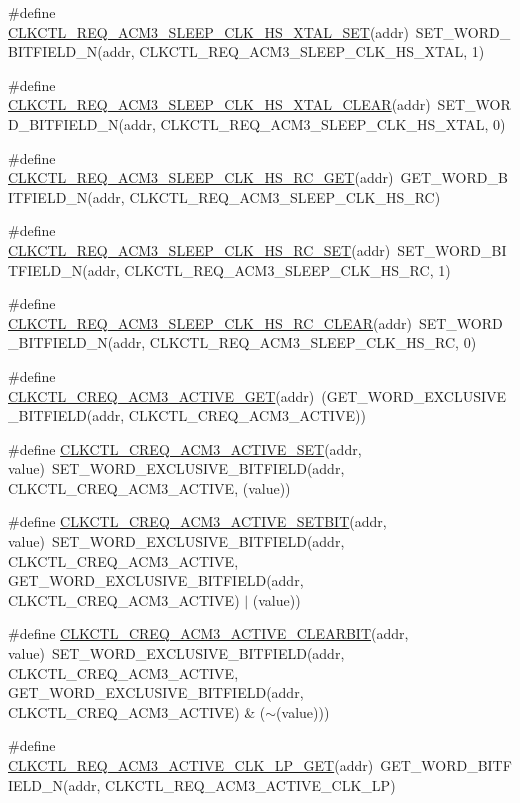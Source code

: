 \begin{DoxyCompactItemize}
\item 
\#define \hyperlink{a00544_a3b97603ae420a4f4932cf851264723a7}{CLKCTL\_\-REQ\_\-ACM3\_\-SLEEP\_\-CLK\_\-HS\_\-XTAL\_\-SET}(addr)~SET\_\-WORD\_\-BITFIELD\_\-N(addr, CLKCTL\_\-REQ\_\-ACM3\_\-SLEEP\_\-CLK\_\-HS\_\-XTAL, 1)
\item 
\#define \hyperlink{a00544_ad00a3b3bf580e5093fbccb3955e1a0e8}{CLKCTL\_\-REQ\_\-ACM3\_\-SLEEP\_\-CLK\_\-HS\_\-XTAL\_\-CLEAR}(addr)~SET\_\-WORD\_\-BITFIELD\_\-N(addr, CLKCTL\_\-REQ\_\-ACM3\_\-SLEEP\_\-CLK\_\-HS\_\-XTAL, 0)
\item 
\#define \hyperlink{a00544_a6a5a31e0deb77cef2989db5e781b746c}{CLKCTL\_\-REQ\_\-ACM3\_\-SLEEP\_\-CLK\_\-HS\_\-RC\_\-GET}(addr)~GET\_\-WORD\_\-BITFIELD\_\-N(addr, CLKCTL\_\-REQ\_\-ACM3\_\-SLEEP\_\-CLK\_\-HS\_\-RC)
\item 
\#define \hyperlink{a00544_a28e37b394303ddebf51e146990edf95c}{CLKCTL\_\-REQ\_\-ACM3\_\-SLEEP\_\-CLK\_\-HS\_\-RC\_\-SET}(addr)~SET\_\-WORD\_\-BITFIELD\_\-N(addr, CLKCTL\_\-REQ\_\-ACM3\_\-SLEEP\_\-CLK\_\-HS\_\-RC, 1)
\item 
\#define \hyperlink{a00544_a158cfcd72570c20b5088de8d681a7d19}{CLKCTL\_\-REQ\_\-ACM3\_\-SLEEP\_\-CLK\_\-HS\_\-RC\_\-CLEAR}(addr)~SET\_\-WORD\_\-BITFIELD\_\-N(addr, CLKCTL\_\-REQ\_\-ACM3\_\-SLEEP\_\-CLK\_\-HS\_\-RC, 0)
\item 
\#define \hyperlink{a00544_a1af37c00ecbba0d3819d4b7ba4bef987}{CLKCTL\_\-CREQ\_\-ACM3\_\-ACTIVE\_\-GET}(addr)~(GET\_\-WORD\_\-EXCLUSIVE\_\-BITFIELD(addr, CLKCTL\_\-CREQ\_\-ACM3\_\-ACTIVE))
\item 
\#define \hyperlink{a00544_a208595a7c955db3bdcb5c833be21d2ce}{CLKCTL\_\-CREQ\_\-ACM3\_\-ACTIVE\_\-SET}(addr, value)~SET\_\-WORD\_\-EXCLUSIVE\_\-BITFIELD(addr, CLKCTL\_\-CREQ\_\-ACM3\_\-ACTIVE, (value))
\item 
\#define \hyperlink{a00544_abbc2571618a311cbf33a1a366389e8f0}{CLKCTL\_\-CREQ\_\-ACM3\_\-ACTIVE\_\-SETBIT}(addr, value)~SET\_\-WORD\_\-EXCLUSIVE\_\-BITFIELD(addr, CLKCTL\_\-CREQ\_\-ACM3\_\-ACTIVE, GET\_\-WORD\_\-EXCLUSIVE\_\-BITFIELD(addr, CLKCTL\_\-CREQ\_\-ACM3\_\-ACTIVE) $|$ (value))
\item 
\#define \hyperlink{a00544_a7db189c21a52967a16dce6f66ea0ab9b}{CLKCTL\_\-CREQ\_\-ACM3\_\-ACTIVE\_\-CLEARBIT}(addr, value)~SET\_\-WORD\_\-EXCLUSIVE\_\-BITFIELD(addr, CLKCTL\_\-CREQ\_\-ACM3\_\-ACTIVE, GET\_\-WORD\_\-EXCLUSIVE\_\-BITFIELD(addr, CLKCTL\_\-CREQ\_\-ACM3\_\-ACTIVE) \& ($\sim$(value)))
\item 
\#define \hyperlink{a00544_a104f44d74ceb47ae237448d86733533a}{CLKCTL\_\-REQ\_\-ACM3\_\-ACTIVE\_\-CLK\_\-LP\_\-GET}(addr)~GET\_\-WORD\_\-BITFIELD\_\-N(addr, CLKCTL\_\-REQ\_\-ACM3\_\-ACTIVE\_\-CLK\_\-LP)

\end{DoxyCompactItemize}
